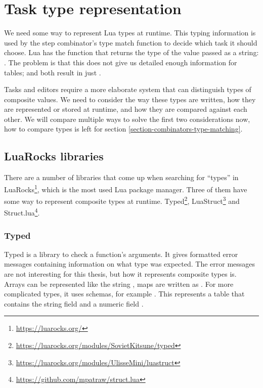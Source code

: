 \section{Task type representation}\label{section-task-types}
We need some way to represent Lua types at runtime. This typing information is used by the step combinator's type match function to decide which task it should choose.
Lua has the  function that returns the type of the value passed as a string: . The problem is that this does not give us detailed enough information for tables;  and  both result in just .

Tasks and editors require a more elaborate system that can distinguish types of composite values. We need to consider the way these types are written, how they are represented or stored at runtime, and how they are compared against each other. We will compare multiple ways to solve the first two considerations now, how to compare types is left for section \ref{section-combinators-type-matching}.

\subsection{LuaRocks libraries}
There are a number of libraries that come up when searching for ``types'' in LuaRocks\footnote{\url{https://luarocks.org/}}, which is the most used Lua package manager. Three of them have some way to represent composite types at runtime.
Typed\footnote{\url{https://luarocks.org/modules/SovietKitsune/typed}}, LuaStruct\footnote{\label{footnote-luastruct}\url{https://luarocks.org/modules/UlisseMini/luastruct}} and Struct.lua\footnote{\url{https://github.com/mpatraw/struct.lua}}.

\subsubsection{Typed}
Typed is a library to check a function's arguments. It gives formatted error messages containing information on what type was expected. The error messages are not interesting for this thesis, but how it represents composite types is. Arrays can be represented like the string , maps are written as . For more complicated types, it uses schemas, for example . This represents a table that contains the string field  and a numeric field .

